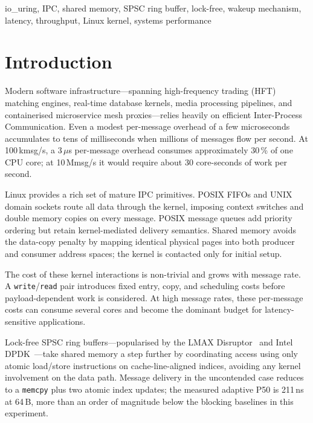 \documentclass[10pt,conference]{IEEEtran}
\begin{document}
\begin{IEEEkeywords}
io\_uring, IPC, shared memory, SPSC ring buffer, lock-free, wakeup mechanism,
latency, throughput, Linux kernel, systems performance
\end{IEEEkeywords}

\section{Introduction}

Modern software infrastructure---spanning high-frequency trading (HFT) matching
engines, real-time database kernels, media processing pipelines, and
containerised microservice mesh proxies---relies heavily on efficient
Inter-Process Communication.  Even a modest per-message overhead of a few
microseconds accumulates to tens of milliseconds when millions of messages flow
per second. At 100\,kmsg/s, a 3\,$\mu$s per-message overhead consumes
approximately 30\,\% of one CPU core; at 10\,Mmsg/s it would require about
30 core-seconds of work per second.

Linux provides a rich set of mature IPC primitives.  POSIX FIFOs and UNIX
domain sockets route all data through the kernel, imposing context switches and
double memory copies on every message.  POSIX message queues add priority
ordering but retain kernel-mediated delivery semantics.  Shared memory avoids
the data-copy penalty by mapping identical physical pages into both producer and
consumer address spaces; the kernel is contacted only for initial setup.

The cost of these kernel interactions is non-trivial and grows with message
rate. A \texttt{write}/\texttt{read} pair introduces fixed entry, copy, and
scheduling costs before payload-dependent work is considered. At high message
rates, these per-message costs can consume several cores and become the
dominant budget for latency-sensitive applications.

Lock-free SPSC ring buffers---popularised by the LMAX
Disruptor~\cite{disruptor} and Intel DPDK~\cite{dpdk}---take shared memory a
step further by coordinating access using only atomic load/store instructions on
cache-line-aligned indices, avoiding any kernel involvement on the data path.
Message delivery in the uncontended case reduces to a \texttt{memcpy} plus two
atomic index updates; the measured adaptive P50 is 211\,ns at 64\,B, more than
an order of magnitude below the blocking baselines in this experiment.
\end{document}
